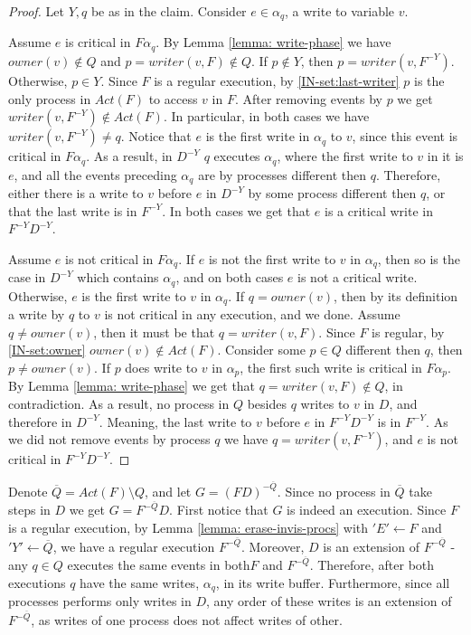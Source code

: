 \begin{proof}
	Let $Y,q$ be as in the claim. Consider $e \in \alpha_q$, a write to variable $v$. 
	
	Assume $e$ is critical in $F \alpha_q$. By Lemma \ref{lemma: write-phase} we have $owner(v) \notin Q$ and $p = writer(v,F) \notin Q$. If $p \notin Y$, then $p = writer(v,F^{-Y})$. Otherwise, $p \in Y$. Since $F$ is a regular execution, by \ref{IN-set:last-writer} $p$ is the only process in $Act(F)$ to access $v$ in $F$. After removing events by $p$ we get $writer(v,F^{-Y}) \notin Act(F)$. In particular, in both cases we have $writer(v,F^{-Y}) \neq q$.
	Notice that $e$ is the first write in $\alpha_q$ to $v$, since this event is critical in $F \alpha_q$. As a result, in $D^{-Y}$ $q$ executes $\alpha_q$, where the first write to $v$ in it is $e$, and all the events preceding $\alpha_q$ are by processes different then $q$. Therefore, either there is a write to $v$ before $e$ in $D^{-Y}$ by some process different then $q$, or that the last write is in $F^{-Y}$. In both cases we get that $e$ is a critical write in $F^{-Y} D^{-Y}$.
	
	Assume $e$ is not critical in $F \alpha_q$. If $e$ is not the first write to $v$ in $\alpha_q$, then so is the case in $D^{-Y}$ which contains $\alpha_q$, and on both cases $e$ is not a critical write. Otherwise, $e$ is the first write to $v$ in $\alpha_q$.
	If $q = owner(v)$, then by its definition a write by $q$ to $v$ is not critical in any execution, and we done. Assume $q \neq owner(v)$, then it must be that $q = writer(v,F)$. Since $F$ is regular, by \ref{IN-set:owner} $owner(v) \notin Act(F)$. Consider some $p \in Q$ different then $q$, then $p \neq owner(v)$. If $p$ does write to $v$ in $\alpha_p$, the first such write is critical in $F \alpha_p$. By Lemma \ref{lemma: write-phase} we get that $q=writer(v,F) \notin Q$, in contradiction. As a result, no process in $Q$ besides $q$ writes to $v$ in $D$, and therefore in $D^{-Y}$. Meaning, the last write to $v$ before $e$ in $F^{-Y} D^{-Y}$ is in $F^{-Y}$. As we did not remove events by process $q$ we have $q = writer(v,F^{-Y})$, and $e$ is not critical in $F^{-Y} D^{-Y}$.
\end{proof}

Denote $\overline{Q} = Act(F) \setminus Q$, and let $G = (F D)^{-\overline{Q}}$. Since no process in $\overline{Q}$ take steps in $D$ we get $G = F^{-\overline{Q}} D$.
First notice that $G$ is indeed an execution. Since $F$ is a regular execution, by Lemma \ref{lemma: erase-invis-procs} with $'E' \leftarrow F$ and $'Y' \leftarrow \overline{Q}$, we have a regular execution $F^{-\overline{Q}}$. Moreover, $D$ is an extension of $F^{-\overline{Q}}$ - any $q \in Q$ executes the same events in both$F$ and $F^{-\overline{Q}}$. Therefore, after both executions $q$ have the same writes, $\alpha_q$, in its write buffer. Furthermore, since all processes performs only writes in $D$, any order of these writes is an extension of $F^{-\overline{Q}}$, as writes of one process does not affect writes of other.

